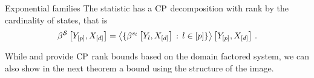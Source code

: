 \begin{example}{Exponential families}
    \label{exa:expFamCP}
    The statistic has a $\mathrm{CP}$ decomposition with rank by the cardinality of states, that is
    \begin{align*}
        \beta^{\mathcal{S}}\left[Y_{[p]},X_{[d]}\right]
        = \left\langle 
            \{ \beta^{s_{l}}\left[Y_{l},X_{[d]}\right] \,:\, l\in[p] \}
        \right\rangle \left[ Y_{[p]},X_{[d]} \right] \, .
    \end{align*}
\end{example}

While  and  provide $\mathrm{CP}$ rank bounds based on the domain factored system, we can also show in the next theorem a bound using the structure of the image.

